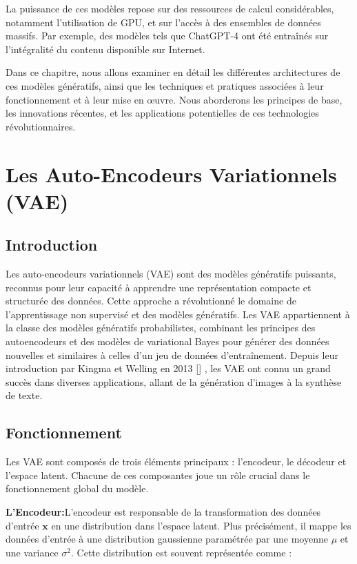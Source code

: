 \medskip

La puissance de ces modèles repose sur des ressources de calcul considérables,
notamment l'utilisation de GPU, et sur l'accès à des ensembles de données
massifs. Par exemple, des modèles tels que ChatGPT-4 ont été entraînés sur
l'intégralité du contenu disponible sur Internet.

\medskip

Dans ce chapitre, nous allons examiner en détail les différentes architectures
de ces modèles génératifs, ainsi que les techniques et pratiques associées à
leur fonctionnement et à leur mise en œuvre. Nous aborderons les principes de
base, les innovations récentes, et les applications potentielles de ces
technologies révolutionnaires.

\section{Les Auto-Encodeurs Variationnels (VAE)}
\subsection{Introduction}

Les auto-encodeurs variationnels (VAE) sont des modèles génératifs puissants,
reconnus pour leur capacité à apprendre une représentation compacte et
structurée des données. Cette approche a révolutionné le domaine de
l'apprentissage non supervisé et des modèles génératifs. Les VAE appartiennent
à la classe des modèles génératifs probabilistes, combinant les principes des
autoencodeurs et des modèles de variational Bayes pour générer des données
nouvelles et similaires à celles d'un jeu de données d'entraînement. Depuis
leur introduction par Kingma et Welling en 2013
	[\cite{kingma_welling_auto_encoding}] , les VAE ont connu un grand succès dans
diverses applications, allant de la génération d'images à la synthèse de texte.

\subsection{Fonctionnement}
Les VAE sont composés de trois éléments principaux : l'encodeur, le décodeur et
l'espace latent. Chacune de ces composantes joue un rôle crucial dans le
fonctionnement global du modèle.

\textbf{L'Encodeur:}L'encodeur est responsable de la transformation des données d'entrée \(\mathbf{x}\) en une distribution
dans l'espace latent. Plus précisément, il mappe les données d'entrée à une distribution gaussienne paramétrée par
une moyenne \(\mu\) et une variance \(\sigma^2\). Cette distribution est souvent représentée comme :

